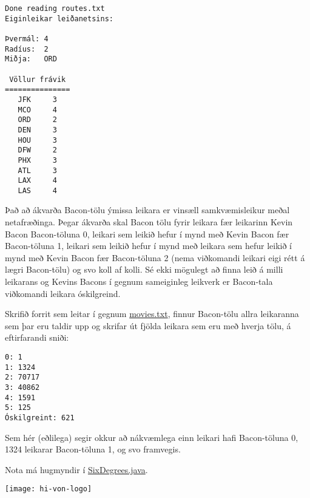 \documentclass{article}
\begin{document}
\begin{verbatim}
Done reading routes.txt
Eiginleikar leiðanetsins:

Þvermál: 4
Radíus:  2
Miðja:   ORD

 Völlur frávik 
===============
   JFK     3   
   MCO     4   
   ORD     2   
   DEN     3   
   HOU     3   
   DFW     2   
   PHX     3   
   ATL     3   
   LAX     4   
   LAS     4  
\end{verbatim}

\question
Það að ákvarða Bacon-tölu ýmissa leikara er vinsæll samkvæmisleikur meðal netafræðinga. Þegar ákvarða skal Bacon tölu fyrir leikara fær leikarinn Kevin Bacon Bacon-töluna 0, leikari sem leikið hefur í mynd með Kevin Bacon fær Bacon-töluna 1, leikari sem leikið hefur í mynd með leikara sem hefur leikið í mynd með Kevin Bacon fær Bacon-töluna 2 (nema viðkomandi leikari eigi rétt á lægri Bacon-tölu) og svo koll af kolli. Sé ekki mögulegt að finna leið á milli leikarans og Kevins Bacons í gegnum sameiginleg leikverk er Bacon-tala viðkomandi leikara óskilgreind.

Skrifið forrit sem leitar í gegnum \href{https://github.com/Ernir/kennsluefni/tree/master/T2/Code/w11/movies.txt}{movies.txt}, finnur Bacon-tölu allra leikaranna sem þar eru taldir upp og skrifar út fjölda leikara sem eru með hverja tölu, á eftirfarandi sniði:

\begin{verbatim}
0: 1
1: 1324
2: 70717
3: 40862
4: 1591
5: 125
Óskilgreint: 621
\end{verbatim}

Sem hér (eðlilega) segir okkur að nákvæmlega einn leikari hafi Bacon-töluna 0, 1324 leikarar Bacon-töluna 1, og svo framvegis.

Nota má hugmyndir í \href{https://github.com/Ernir/kennsluefni/tree/master/T2/Code/w11/SixDegrees.java}{SixDegrees.java}.

\vfill
\texttt{[image: hi-von-logo]}
\end{document}
